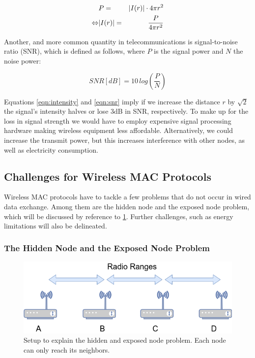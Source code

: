\begin{eqnarray} 
	& P = & \abs{I(r)} \cdot 4\pi r^2 \\
	\label{eqn:intensity}
	\Leftrightarrow & \abs{I(r)} = & \frac{P}{4\pi r^2} 
\end{eqnarray}

Another, and more common quantity in telecommunications is signal-to-noise ratio (SNR), which is defined as follows, where $P$ is the signal power and $N$ the noise power: 

\begin{equation} \label{eqn:snr}
	SNR [dB] = 10 \, log \left( \frac{P}{N} \right)
\end{equation}

Equations \ref{eqn:intensity} and \ref{eqn:snr} imply if we increase the distance $r$ by $\sqrt{2}$ the signal's intensity halves or lose 3dB in SNR, respectively. To make up for the loss in signal strength we would have to employ expensive signal processing hardware making wireless equipment less affordable. Alternatively, we could increase the transmit power, but this increases interference with other nodes, as well as electricity consumption.  

\subsection{Challenges for Wireless MAC Protocols}

Wireless MAC protocols have to tackle a few problems that do not occur in wired data exchange. Among them are the hidden node and the exposed node problem, which will be discussed by reference to \ref{fig:hidden_exposed_node_problem}. Further challenges, such as energy limitations will also be delineated.

\subsubsection{The Hidden Node and the Exposed Node Problem}

\begin{figure}[ht]
	\label{fig:hidden_exposed_node_problem}
	\begin{center}
		\includegraphics[width=12cm]{pictures/hidden_exposed_node_problem}
	\end{center}
	\caption{Setup to explain the hidden and exposed node problem. Each node can only reach its neighbors.}
\end{figure}

